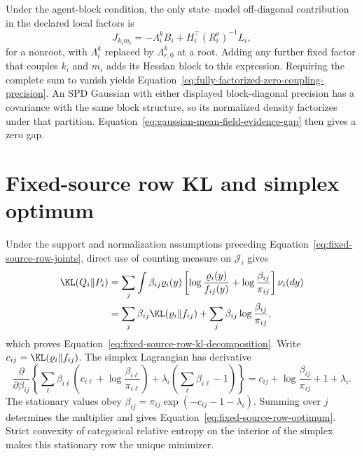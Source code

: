 Under the agent-block condition, the only state--model off-diagonal contribution in the declared local factors is
\begin{equation}
J_{k_i m_i}
=-\Lambda_i^kB_i
+H_i^\top(R_i^o)^{-1}L_i,
\label{eq:appendix-local-state-model-total}
\end{equation}
for a nonroot, with \(\Lambda_i^k\) replaced by \(\Lambda_{r,0}^k\) at a root. Adding any further fixed factor that couples \(k_i\) and \(m_i\) adds its Hessian block to this expression. Requiring the complete sum to vanish yields Equation~\eqref{eq:fully-factorized-zero-coupling-precision}. An SPD Gaussian with either displayed block-diagonal precision has a covariance with the same block structure, so its normalized density factorizes under that partition. Equation~\eqref{eq:gaussian-mean-field-evidence-gap} then gives a zero gap.

\section{Fixed-source row KL and simplex optimum}
\label{sec:fixed-source-row-proof}

Under the support and normalization assumptions preceding Equation~\eqref{eq:fixed-source-row-joints}, direct use of counting measure on \(\mathcal J_i\) gives
\begin{align}
\KL(Q_i\Vert P_i)
&=\sum_j\int\beta_{ij}\varrho_i(y)
\left[
\log\frac{\varrho_i(y)}{f_{ij}(y)}
+\log\frac{\beta_{ij}}{\pi_{ij}}
\right]\nu_i(dy)\notag\\
&=\sum_j\beta_{ij}\KL(\varrho_i\Vert f_{ij})
+\sum_j\beta_{ij}\log\frac{\beta_{ij}}{\pi_{ij}},
\label{eq:appendix-fixed-source-row-kl}
\end{align}
which proves Equation~\eqref{eq:fixed-source-row-kl-decomposition}. Write \(c_{ij}=\KL(\varrho_i\Vert f_{ij})\). The simplex Lagrangian has derivative
\begin{equation}
\frac{\partial}{\partial\beta_{ij}}
\left\{
\sum_\ell\beta_{i\ell}
\left(c_{i\ell}+\log\frac{\beta_{i\ell}}{\pi_{i\ell}}\right)
+\lambda_i\left(\sum_\ell\beta_{i\ell}-1\right)
\right\}
=c_{ij}+\log\frac{\beta_{ij}}{\pi_{ij}}+1+\lambda_i.
\label{eq:appendix-fixed-source-simplex-derivative}
\end{equation}
The stationary values obey \(\beta_{ij}=\pi_{ij}\exp(-c_{ij}-1-\lambda_i)\). Summing over \(j\) determines the multiplier and gives Equation~\eqref{eq:fixed-source-row-optimum}. Strict convexity of categorical relative entropy on the interior of the simplex makes this stationary row the unique minimizer.

